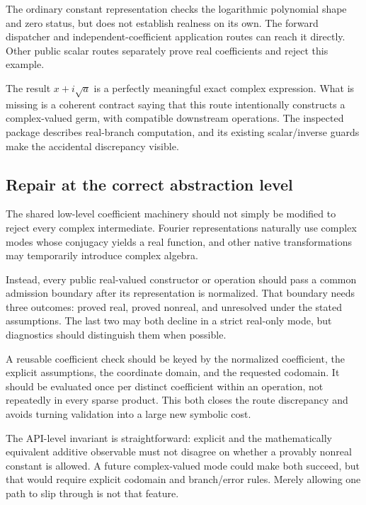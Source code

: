 \documentclass[11pt,letterpaper]{article}
\newcommand{\code}[1]{\texttt{\detokenize{#1}}}
\begin{document}
The ordinary constant representation \code{pConst} checks the logarithmic polynomial shape and zero status, but does not establish realness on its own. The forward dispatcher and independent-coefficient application routes can reach it directly. Other public scalar routes separately prove real coefficients and reject this example.\cite{core,operations}

The result $x+i\sqrt a$ is a perfectly meaningful exact complex expression. What is missing is a coherent contract saying that this route intentionally constructs a complex-valued germ, with compatible downstream operations. The inspected package describes real-branch computation, and its existing scalar/inverse guards make the accidental discrepancy visible.\cite{readme,core,operations}

\subsection{Repair at the correct abstraction level}
The shared low-level coefficient machinery should not simply be modified to reject every complex intermediate. Fourier representations naturally use complex modes whose conjugacy yields a real function, and other native transformations may temporarily introduce complex algebra.\cite{fourier,native}

Instead, every public real-valued constructor or operation should pass a common admission boundary after its representation is normalized. That boundary needs three outcomes: proved real, proved nonreal, and unresolved under the stated assumptions. The last two may both decline in a strict real-only mode, but diagnostics should distinguish them when possible.

A reusable coefficient check should be keyed by the normalized coefficient, the explicit assumptions, the coordinate domain, and the requested codomain. It should be evaluated once per distinct coefficient within an operation, not repeatedly in every sparse product. This both closes the route discrepancy and avoids turning validation into a large new symbolic cost.

The API-level invariant is straightforward: explicit \code{SeriesAdd[s,c]} and the mathematically equivalent additive observable must not disagree on whether a provably nonreal constant is allowed. A future complex-valued mode could make both succeed, but that would require explicit codomain and branch/error rules. Merely allowing one path to slip through is not that feature.
\end{document}
